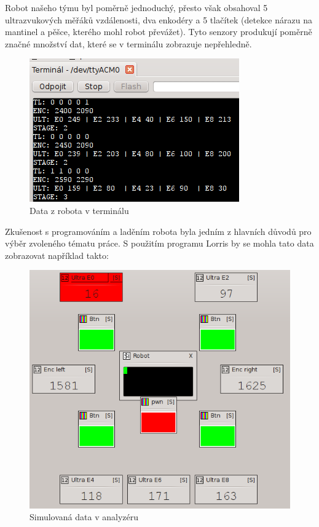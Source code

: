 \documentclass[12pt, a4paper, oneside]{article}
\begin{document}
Robot našeho týmu byl poměrně jednoduchý, přesto však obsahoval 5 ultrazvukových měřáků vzdálenosti, dva enkodéry a 5 tlačítek (detekce nárazu na mantinel a pěšce, kterého mohl robot převážet). Tyto senzory produkují poměrně značné množství dat, které se v terminálu zobrazuje nepřehledně.

\begin{figure}[H]
\begin{center}
\includegraphics{img/use_david1.png}
\caption{Data z robota v terminálu}
\end{center}
\end{figure}

Zkušenost s programováním a laděním robota byla jedním z hlavních důvodů pro výběr zvoleného tématu práce. S použitím programu Lorris by se mohla tato data zobrazovat například takto:
\begin{figure}[H]
\begin{center}
\includegraphics{img/use_david2.png}
\caption{Simulovaná data v analyzéru}
\end{center}
\end{figure}
\end{document}
